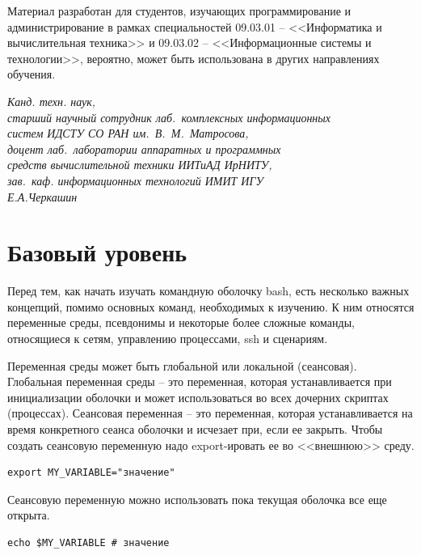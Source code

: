 \documentclass[a4paper,12pt,final,openany]{extbook}
\begin{document}
Материал разработан для студентов, изучающих программирование и администрирование в рамках специальностей 09.03.01 -- <<Информатика и вычислительная техника>> и 09.03.02 -- <<Информационные системы и технологии>>, вероятно, может быть использована в других направлениях обучения.

\vspace{3em}
\begin{flushright}\it
  Канд. техн. наук, \\
  старший научный сотрудник лаб.~комплексных информационных\\ систем ИДСТУ СО РАН им.~В.~М.~Матросова,\\
  доцент лаб.~лаборатории аппаратных и программных\\ средств вычислительной техники ИИТиАД ИрНИТУ,\\ зав.~каф. информационных технологий ИМИТ ИГУ\\ Е.А.Черкашин
\end{flushright}

\clearpage

\hypertarget{Environment-variables}{%
\chapter{Базовый уровень}\label{Environment-variables}}

Перед тем, как начать изучать командную оболочку bash, есть несколько
важных концепций, помимо основных команд, необходимых к изучению. К ним относятся переменные среды, псевдонимы и некоторые более сложные команды, относящиеся к сетям, управлению процессами, ssh и сценариям.

Переменная среды может быть глобальной или локальной (сеансовая). Глобальная
переменная среды -- это переменная, которая устанавливается при
инициализации оболочки и может использоваться во всех дочерних скриптах (процессах).
Сеансовая переменная -- это переменная, которая
устанавливается на время конкретного сеанса оболочки и исчезает при, если ее
закрыть. Чтобы создать сеансовую переменную надо export-ировать
ее во <<внешнюю>> среду.

\begin{verbatim}
export MY_VARIABLE="значение"
\end{verbatim}

Сеансовую переменную можно использовать пока текущая оболочка все еще открыта.

\begin{verbatim}
echo $MY_VARIABLE # значение
\end{verbatim}
\end{document}
